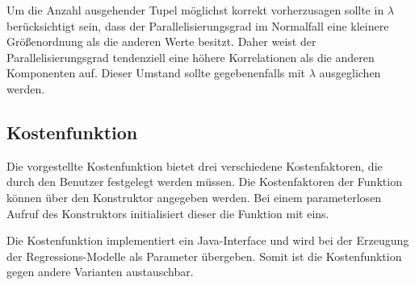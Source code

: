Um die Anzahl ausgehender Tupel möglichst korrekt vorherzusagen sollte in \(\lambda\) berücksichtigt sein, dass der Parallelisierungsgrad im Normalfall eine kleinere Größenordnung als die anderen Werte besitzt.
Daher weist der Parallelisierungsgrad tendenziell eine höhere Korrelationen als die anderen Komponenten auf.
Dieser Umstand sollte gegebenenfalls mit \(\lambda\) ausgeglichen werden.

\subsection{Kostenfunktion}

Die vorgestellte Kostenfunktion bietet drei verschiedene Kostenfaktoren, die durch den Benutzer festgelegt werden müssen.
Die Kostenfaktoren der Funktion können über den Konstruktor angegeben werden.
Bei einem parameterlosen Aufruf des Konstruktors initialisiert dieser die Funktion mit eins.

Die Kostenfunktion implementiert ein Java-Interface und wird bei der Erzeugung der Regressions-Modelle als Parameter übergeben.
Somit ist die Kostenfunktion gegen andere Varianten austauschbar.






